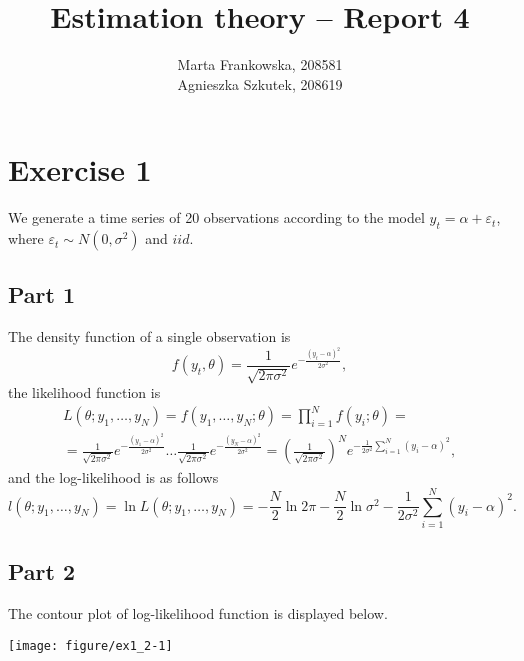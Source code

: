 \documentclass[12pt, a4paper]{article}\usepackage[]{graphicx}\usepackage[]{color}
\makeatletter
\def\maxwidth{ %
  \ifdim\Gin@nat@width>\linewidth
    \linewidth
  \else
    \Gin@nat@width
  \fi
}
\newenvironment{knitrout}{}{} %
\makeatother
\begin{document}
\title{Estimation theory -- Report 4}
\author{Marta Frankowska, 208581 \\ Agnieszka Szkutek, 208619}
\maketitle
\tableofcontents 



\section{Exercise 1}
We generate a time series of 20 observations according to the model $y_t = \alpha + \varepsilon_t$, where $\varepsilon_t \sim N(0,\sigma^2)$ and $iid$.

\subsection{Part 1}
The density function of a single observation is 
\[ f(y_t,\theta) = \frac{1}{\sqrt{2\pi\sigma^2}} e^{-\frac{(y_t-\alpha)^2}{2\sigma^2}},  \]
the likelihood function is 
\begin{gather*} 
L(\theta; y_1,\dots,y_N) = f(y_1,\dots,y_N; \theta) = \prod_{i=1}^{N} f(y_i; \theta) = \\
= \frac{1}{\sqrt{2\pi\sigma^2}} e^{-\frac{(y_1-\alpha)^2}{2\sigma^2}} \dots  \frac{1}{\sqrt{2\pi\sigma^2}} e^{-\frac{(y_N-\alpha)^2}{2\sigma^2}}
=  \left(\frac{1}{\sqrt{2\pi\sigma^2}} \right)^N e^{-\frac{1}{2\sigma^2} \sum_{i=1}^N (y_i-\alpha)^2} ,
\end{gather*}
and the log-likelihood is as follows
\[ l(\theta; y_1,\dots,y_N) = \ln{L(\theta; y_1,\dots,y_N)} = -\frac{N}{2} \ln{2\pi} -\frac{N}{2} \ln{\sigma^2} -\frac{1}{2\sigma^2} \sum_{i=1}^N (y_i-\alpha)^2.\]


\subsection{Part 2}
The contour plot of log-likelihood function is displayed below.
\begin{knitrout}
\color{fgcolor}

{\centering \texttt{[image: figure/ex1\_2-1]} 

}



\end{knitrout}
\end{document}
